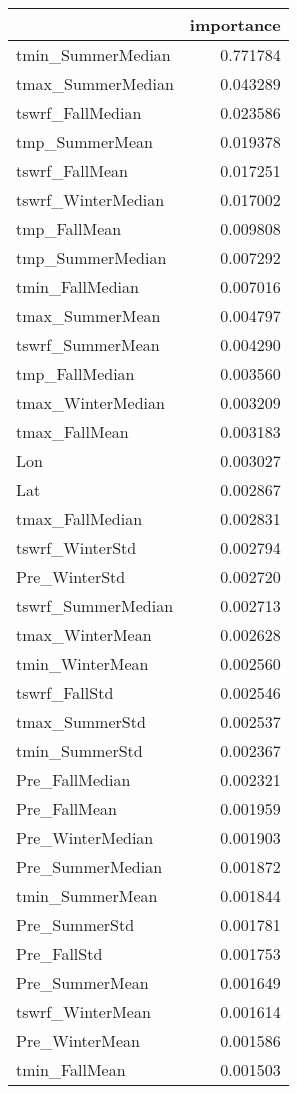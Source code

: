 \begin{tabular}{lr}
\toprule
 & importance \\
\midrule
tmin_SummerMedian & 0.771784 \\
tmax_SummerMedian & 0.043289 \\
tswrf_FallMedian & 0.023586 \\
tmp_SummerMean & 0.019378 \\
tswrf_FallMean & 0.017251 \\
tswrf_WinterMedian & 0.017002 \\
tmp_FallMean & 0.009808 \\
tmp_SummerMedian & 0.007292 \\
tmin_FallMedian & 0.007016 \\
tmax_SummerMean & 0.004797 \\
tswrf_SummerMean & 0.004290 \\
tmp_FallMedian & 0.003560 \\
tmax_WinterMedian & 0.003209 \\
tmax_FallMean & 0.003183 \\
Lon & 0.003027 \\
Lat & 0.002867 \\
tmax_FallMedian & 0.002831 \\
tswrf_WinterStd & 0.002794 \\
Pre_WinterStd & 0.002720 \\
tswrf_SummerMedian & 0.002713 \\
tmax_WinterMean & 0.002628 \\
tmin_WinterMean & 0.002560 \\
tswrf_FallStd & 0.002546 \\
tmax_SummerStd & 0.002537 \\
tmin_SummerStd & 0.002367 \\
Pre_FallMedian & 0.002321 \\
Pre_FallMean & 0.001959 \\
Pre_WinterMedian & 0.001903 \\
Pre_SummerMedian & 0.001872 \\
tmin_SummerMean & 0.001844 \\
Pre_SummerStd & 0.001781 \\
Pre_FallStd & 0.001753 \\
Pre_SummerMean & 0.001649 \\
tswrf_WinterMean & 0.001614 \\
Pre_WinterMean & 0.001586 \\
tmin_FallMean & 0.001503 \\

\end{tabular}
